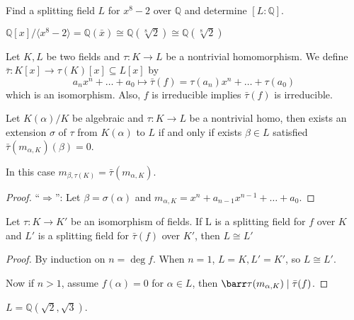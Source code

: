\begin{example}
  Find a splitting field $L$ for $x^8 - 2$ over $\mathbb{Q}$ and determine $[L : \mathbb{Q}]$.
\end{example}

\begin{remark}
  $\mathbb{Q}[x] / \langle x^8 - 2 \rangle= \mathbb{Q}(\bar{x}) \cong \mathbb{Q}(\sqrt[8]{2})
  \cong \mathbb{Q}(\sqrt[8]{2})$
\end{remark}

\begin{proposition}
  Let $K, L$ be two fields and $\tau: K \to L$ be a nontrivial homomorphism.
  We define $\bar\tau : K[x] \to \tau(K)[x] \subseteq L[x]$ by
  \[ a_n x^n + \ldots + a_0 \mapsto \bar\tau(f) = \tau(a_n)x^n + \ldots + \tau(a_0) \]
  which is an isomorphism. Also, $f$ is irreducible implies $\bar\tau(f)$ is irreducible.
\end{proposition}

\begin{lemma}
  Let $K(\alpha) / K$ be algebraic and $\tau: K \to L$ be a nontrivial homo,
  then exists an extension $\sigma$ of $\tau$ from $K(\alpha)$ to $L$ if and only if
  exists $\beta \in L$ satisfied $\bar\tau(m_{\alpha, K})(\beta) = 0$.

  In this case $m_{\beta, \tau(K)} = \bar\tau(m_{\alpha, K})$.
\end{lemma}

\begin{proof}
  ``$\Rightarrow$'': Let $\beta = \sigma(\alpha)$ and $m_{\alpha, K} = x^n + a_{n-1} x^{n-1} + \ldots + a_0$.
\end{proof}

\begin{theorem}
  Let $\tau: K \to K'$ be an isomorphism of fields.
  If L is a splitting field for $f$ over $K$ and $L'$ is a splitting field for $\bar\tau(f)$
  over $K'$, then $L \cong L'$
\end{theorem}

\begin{proof}
  By induction on $n = \deg f$. When $n = 1$, $L = K, L' = K'$, so $L \cong L'$.

  Now if $n > 1$, assume $f(\alpha) = 0$ for $\alpha \in L$, then $\barr\tau(m_{\alpha, K}) \mid \bar\tau(f)$.
\end{proof}

\begin{example}
  $L = \mathbb{Q}(\sqrt{2}, \sqrt{3})$.
\end{example}
